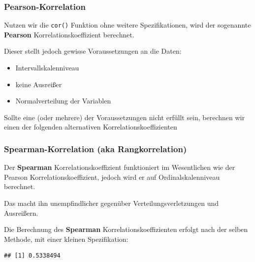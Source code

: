 \documentclass[
]{book}
\newenvironment{Shaded}{\begin{snugshade}}{\end{snugshade}}
\newcommand{\AttributeTok}[1]{\textcolor[rgb]{0.77,0.63,0.00}{#1}}
\newcommand{\FunctionTok}[1]{\textcolor[rgb]{0.00,0.00,0.00}{#1}}
\newcommand{\NormalTok}[1]{#1}
\newcommand{\SpecialCharTok}[1]{\textcolor[rgb]{0.00,0.00,0.00}{#1}}
\newcommand{\StringTok}[1]{\textcolor[rgb]{0.31,0.60,0.02}{#1}}
\providecommand{\tightlist}{%
  \setlength{\itemsep}{0pt}\setlength{\parskip}{0pt}}
\begin{document}
\hypertarget{pearson-korrelation}{%
\subsubsection{Pearson-Korrelation}\label{pearson-korrelation}}

Nutzen wir die \texttt{cor()} Funktion ohne weitere Spezifikationen, wird der sogenannte \textbf{Pearson} Korrelationskoeffizient berechnet.

Dieser stellt jedoch gewisse Voraussetzungen an die Daten:

\begin{itemize}
\tightlist
\item
  Intervallskalenniveau
\item
  keine Ausreißer
\item
  Normalverteilung der Variablen
\end{itemize}

Sollte eine (oder mehrere) der Voraussetzungen nicht erfüllt sein, berechnen wir einen der folgenden alternativen Korrelationskoeffizienten

\hypertarget{spearman-korrelation-aka-rangkorrelation}{%
\subsubsection{Spearman-Korrelation (aka Rangkorrelation)}\label{spearman-korrelation-aka-rangkorrelation}}

Der \textbf{Spearman} Korrelationskoeffizient funktioniert im Wesentlichen wie der Pearson Korrelationskoeffizient, jedoch wird er auf Ordinalskalenniveau berechnet.

Das macht ihn unempfindlicher gegenüber Verteilungsverletzungen und Ausreißern.

Die Berechnung des \textbf{Spearman} Korrelationskoeffizienten erfolgt nach der selben Methode, mit einer kleinen Spezifikation:

\begin{Shaded}
\end{Shaded}

\begin{verbatim}
## [1] 0.5338494
\end{verbatim}
\end{document}
